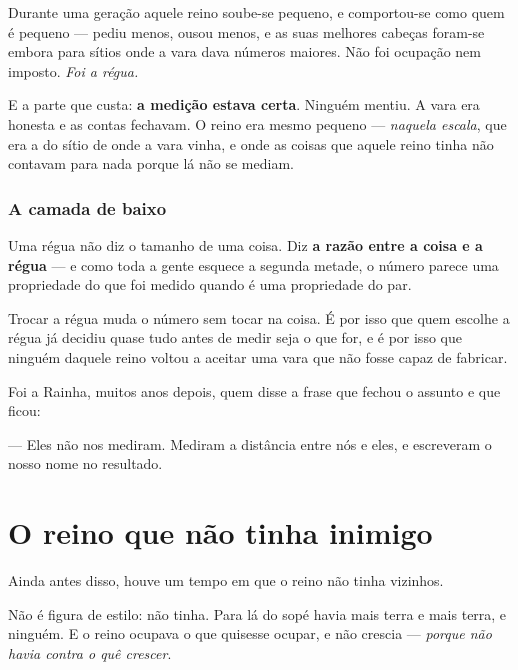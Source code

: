 \documentclass[livro.tex]{subfiles}
\begin{document}
\medskip

Durante uma geração aquele reino soube-se pequeno, e comportou-se como quem é pequeno --- pediu
menos, ousou menos, e as suas melhores cabeças foram-se embora para sítios onde a vara dava
números maiores. Não foi ocupação nem imposto. \emph{Foi a régua.}

\medskip

E a parte que custa: \textbf{a medição estava certa}. Ninguém mentiu. A vara era honesta e as
contas fechavam. O reino era mesmo pequeno --- \emph{naquela escala}, que era a do sítio de onde a
vara vinha, e onde as coisas que aquele reino tinha não contavam para nada porque lá não se
mediam.

\subsection*{A camada de baixo}

Uma régua não diz o tamanho de uma coisa. Diz \textbf{a razão entre a coisa e a régua} --- e como
toda a gente esquece a segunda metade, o número parece uma propriedade do que foi medido quando é
uma propriedade do par.

\medskip

Trocar a régua muda o número sem tocar na coisa. É por isso que quem escolhe a régua já decidiu
quase tudo antes de medir seja o que for, e é por isso que ninguém daquele reino voltou a aceitar
uma vara que não fosse capaz de fabricar.

\medskip

Foi a Rainha, muitos anos depois, quem disse a frase que fechou o assunto e que ficou:

\medskip

--- Eles não nos mediram. Mediram a distância entre nós e eles, e escreveram o nosso nome no
resultado.

\chapter{O reino que não tinha inimigo}

Ainda antes disso, houve um tempo em que o reino não tinha vizinhos.

\medskip

Não é figura de estilo: não tinha. Para lá do sopé havia mais terra e mais terra, e ninguém. E o
reino ocupava o que quisesse ocupar, e não crescia --- \emph{porque não havia contra o quê
crescer}.
\end{document}
